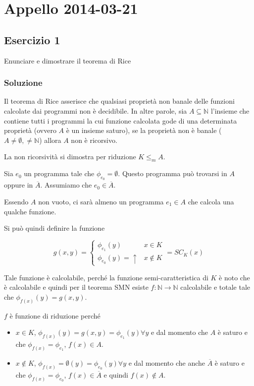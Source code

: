 \section{Appello 2014-03-21}

\subsection{Esercizio 1}

Enunciare e dimostrare il teorema di Rice

\subsubsection{Soluzione}

Il teorema di Rice asserisce che qualsiasi proprietà non banale delle funzioni calcolate dai programmi  non è decidibile.
In altre parole, sia $A \subseteq \mathbb{N}$ l'insieme che contiene tutti i programmi la cui funzione calcolata gode di una determinata proprietà (ovvero $A$ è un insieme saturo), se la proprietà non è banale ($A \neq \emptyset, \neq \mathbb{N}$) allora $A$ non è ricorsivo.

La non ricorsività si dimostra per riduzione $K \leq_m A$.

Sia $e_0$ un programma tale che $\phi_{e_0} = \emptyset$. Questo programma può trovarsi in $A$ oppure in $\overline{A}$. Assumiamo che $e_0 \in \overline{A}$.

Essendo $A$ non vuoto, ci sarà almeno un programma $e_1 \in A$ che calcola una qualche funzione.

Si può quindi definire la funzione

$$
g(x,y) = \begin{cases}
\phi_{e_1}(y) &x \in K \\
\phi_{e_0}(y) = \uparrow &x \notin K
\end{cases} = SC_K(x)
$$

Tale funzione è calcolabile, perché la funzione semi-caratteristica di $K$ è noto che è calcolabile e quindi per il teorema SMN esiste $f : \mathbb{N} \rightarrow \mathbb{N}$ calcolabile e totale tale che $\phi_{f(x)}(y) = g(x,y)$.

$f$ è funzione di riduzione perché

\begin{itemize}
	\item $x \in K$, $\phi_{f(x)}(y) = g(x,y) = \phi_{e_1}(y) \forall y$ e dal momento che $A$ è saturo e che $\phi_{f(x)} = \phi_{e_1}$, $f(x) \in A$.
	\item $x \notin K$, $\phi_{f(x)} = \emptyset(y) = \phi_{e_0}(y) \forall y$ e dal momento che anche $\overline{A}$ è saturo e che $\phi_{f(x)} = \phi_{e_0}$, $f(x) \in \overline{A}$ e quindi $f(x) \notin A$.
\end{itemize}

